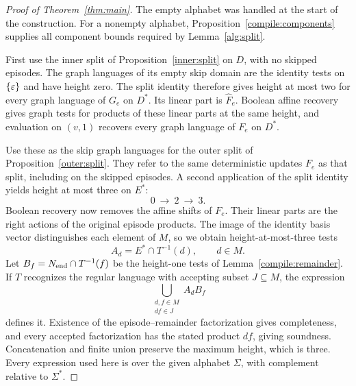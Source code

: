 \begin{proof}[Proof of Theorem~\ref{thm:main}]
The empty alphabet was handled at the start of the construction. For a
nonempty alphabet, Proposition~\ref{compile:components} supplies all
component bounds required by Lemma~\ref{alg:split}.

First use the inner split of Proposition~\ref{inner:split} on $D$, with
no skipped episodes. The graph languages of its empty skip domain are
the identity tests on $\{\varepsilon\}$ and have height zero. The split identity
therefore gives height at most two for every graph language of $G_e$ on
$D^*$. Its linear part is $\widehat F_e$. Boolean affine recovery gives
graph tests for products of these linear parts at the same height, and
evaluation on $(v,1)$ recovers every graph language of $F_e$ on $D^*$.

Use these as the skip graph languages for the outer split of
Proposition~\ref{outer:split}. They refer to the same deterministic
updates $F_e$ as that split, including on the skipped episodes. A second
application of the split identity yields height at most three on $E^*$:
\[
                  0\ \longrightarrow\ 2\ \longrightarrow\ 3.
\]
Boolean recovery now removes the affine shifts of $F_e$. Their linear
parts are the right actions of the original episode products. The image
of the identity basis vector distinguishes each element of $M$, so we
obtain height-at-most-three tests
\[
                       A_d=E^*\cap T^{-1}(d),\qquad d\in M.
\]
Let $B_f=N_{\rm end}\cap T^{-1}(f)$ be the height-one tests of
Lemma~\ref{compile:remainder}. If $T$ recognizes the regular language
with accepting subset $J\subseteq M$, the expression
\[
                \bigcup_{\substack{d,f\in M\\df\in J}} A_d B_f
\]
defines it. Existence of the episode--remainder factorization gives
completeness, and every accepted factorization has the stated product
$df$, giving soundness. Concatenation and finite union preserve the
maximum height, which is three. Every expression used here is over the
given alphabet $\Sigma$, with complement relative to $\Sigma^*$.
\end{proof}
